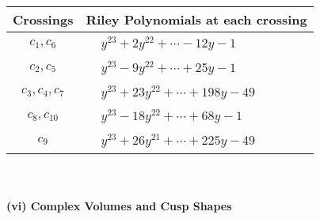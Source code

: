 \documentclass[1p]{elsarticle_modified}
\theoremstyle{definition}
\begin{document}
\begin{tabular}{m{50pt}|m{274pt}}
Crossings & \hspace{64pt}Riley Polynomials at each crossing \\
\hline $$\begin{aligned}c_{1},c_{6}\end{aligned}$$&$\begin{aligned}
&y^{23}+2 y^{22}+\cdots-12 y-1
\end{aligned}$\\
\hline $$\begin{aligned}c_{2},c_{5}\end{aligned}$$&$\begin{aligned}
&y^{23}-9 y^{22}+\cdots+25 y-1
\end{aligned}$\\
\hline $$\begin{aligned}c_{3},c_{4},c_{7}\end{aligned}$$&$\begin{aligned}
&y^{23}+23 y^{22}+\cdots+198 y-49
\end{aligned}$\\
\hline $$\begin{aligned}c_{8},c_{10}\end{aligned}$$&$\begin{aligned}
&y^{23}-18 y^{22}+\cdots+68 y-1
\end{aligned}$\\
\hline $$\begin{aligned}c_{9}\end{aligned}$$&$\begin{aligned}
&y^{23}+26 y^{21}+\cdots+225 y-49
\end{aligned}$\\
\hline
\end{tabular}\\~\\
\newpage\flushleft \textbf{(vi) Complex Volumes and Cusp Shapes}
\end{document}
